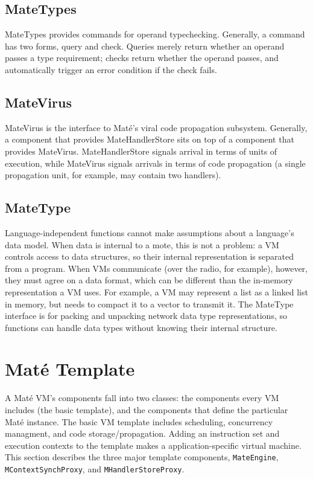 \documentclass[12pt]{article}
\newcommand{\mate}{Mat\'{e}\xspace}
\begin{document}
\subsection{MateTypes}

MateTypes provides commands for operand typechecking. Generally, a
command has two forms, query and check. Queries merely return whether
an operand passes a type requirement; checks return whether the
operand passes, and automatically trigger an error condition if the
check fails.

\subsection{MateVirus}

MateVirus is the interface to \mate's viral code propagation
subsystem. Generally, a component that provides MateHandlerStore sits
on top of a component that provides MateVirus. MateHandlerStore
signals arrival in terms of units of execution, while MateVirus
signals arrivals in terms of code propagation (a single propagation
unit, for example, may contain two handlers).

\subsection{MateType}

Language-independent functions cannot make assumptions about a
language's data model. When data is internal to a mote, this
is not a problem: a VM controls access to data structures, so
their internal representation is separated from a program. When
VMs communicate (over the radio, for example), however, they must
agree on a data format, which can be different than the in-memory
representation a VM uses. For example, a VM may represent a list
as a linked list in memory, but needs to compact it to a vector to
transmit it. The MateType interface is for packing and unpacking
network data type representations, so functions can handle data types
without knowing their internal structure.

\section{\mate Template}

A \mate VM's components fall into two classes: the components every VM
includes (the basic template), and the components that define the
particular \mate instance. The basic VM template includes scheduling,
concurrency managment, and code storage/propagation. Adding an
instruction set and execution contexts to the template makes a
application-specific virtual machine. This section describes the three
major template components, {\tt MateEngine}, {\tt MContextSynchProxy},
and {\tt MHandlerStoreProxy}.
\end{document}
